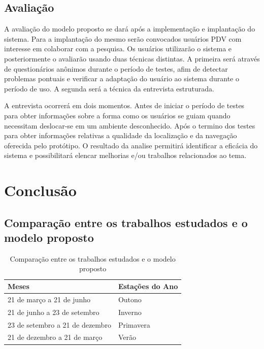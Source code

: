 \documentclass[english,brazilian]{UNISINOSmonografia}
\begin{document}
	\section{Avaliação}
A avaliação do modelo proposto se dará após a implementação e implantação do sistema. Para a implantação do mesmo serão convocados usuários PDV com interesse em colaborar com a pesquisa. Os usuários utilizarão o sistema e posteriormente o avaliarão usando duas técnicas distintas. A primeira será através de questionários anônimos durante o período de testes, afim de detectar problemas pontuais e verificar a adaptação do usuário ao sistema durante o período de uso. A segunda será a técnica da entrevista estruturada. 

A entrevista ocorrerá em dois momentos. Antes de iniciar o período de testes para obter informações sobre a forma como os usuários se guiam quando necessitam deslocar-se em um ambiente desconhecido. Após o termino dos testes para obter informações relativas a qualidade da localização e da navegação oferecida pelo protótipo. O resultado da analise permitirá identificar a eficácia do sistema e possibilitará elencar melhorias e/ou trabalhos relacionados ao tema.









\chapter{Conclusão}

	\section{Comparação entre os trabalhos estudados e o modelo proposto}

\begin{table}
	\caption{Comparação entre os trabalhos estudados e o modelo proposto}
	\centering%
	\begin{minipage}{.6\textwidth}
		\begin{tabular*}{\textwidth}{ll}
			\hline
			\textbf{Meses} & \textbf{Estações do Ano}\\
			\hline
			21 de março a 21 de junho & Outono\\
			21 de junho a 23 de setembro & Inverno\\
			23 de setembro a 21 de dezembro & Primavera\\
			21 de dezembro a 21 de março & Verão\\
			\hline
		\end{tabular*}
	\end{minipage}
\end{table}
	
\end{document}
